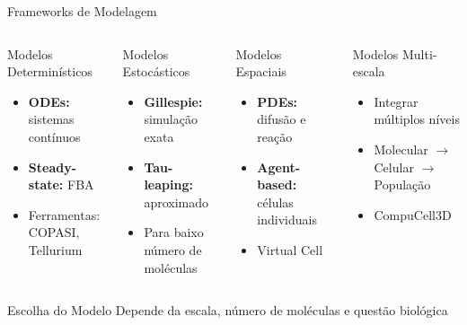 \begin{frame}{Frameworks de Modelagem}
\begin{columns}
\begin{block}{Modelos Determinísticos}
\begin{itemize}
    \item \textbf{ODEs:} sistemas contínuos
    \item \textbf{Steady-state:} FBA
    \item Ferramentas: COPASI, Tellurium
\end{itemize}
\end{block}

\begin{block}{Modelos Estocásticos}
\begin{itemize}
    \item \textbf{Gillespie:} simulação exata
    \item \textbf{Tau-leaping:} aproximado
    \item Para baixo número de moléculas
\end{itemize}
\end{block}

\begin{block}{Modelos Espaciais}
\begin{itemize}
    \item \textbf{PDEs:} difusão e reação
    \item \textbf{Agent-based:} células individuais
    \item Virtual Cell
\end{itemize}
\end{block}

\begin{block}{Modelos Multi-escala}
\begin{itemize}
    \item Integrar múltiplos níveis
    \item Molecular $\rightarrow$ Celular $\rightarrow$ População
    \item CompuCell3D
\end{itemize}
\end{block}
\end{columns}

\vspace{0.3cm}

\begin{exampleblock}{Escolha do Modelo}
Depende da escala, número de moléculas e questão biológica
\end{exampleblock}
\end{frame}

